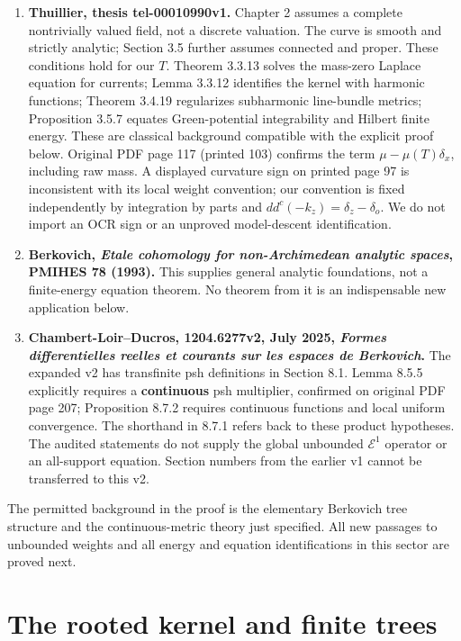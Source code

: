 \documentclass[
  11pt,
]{article}
\begin{document}
\begin{enumerate}
  projective-line tree. The two closed coordinate disks do not intersect
  only in the Gauss point.
\item
  \textbf{Thuillier, thesis tel-00010990v1.} Chapter 2 assumes a
  complete nontrivially valued field, not a discrete valuation. The
  curve is smooth and strictly analytic; Section 3.5 further assumes
  connected and proper. These conditions hold for our \(T\). Theorem
  3.3.13 solves the mass-zero Laplace equation for currents; Lemma
  3.3.12 identifies the kernel with harmonic functions; Theorem 3.4.19
  regularizes subharmonic line-bundle metrics; Proposition 3.5.7 equates
  Green-potential integrability and Hilbert finite energy. These are
  classical background compatible with the explicit proof below.
  Original PDF page 117 (printed 103) confirms the term
  \(\mu-\mu(T)\delta_x\), including raw mass. A displayed curvature sign
  on printed page 97 is inconsistent with its local weight convention;
  our convention is fixed independently by integration by parts and
  \(dd^c(-k_z)=\delta_z-\delta_o\). We do not import an OCR sign or an
  unproved model-descent identification.
\item
  \textbf{Berkovich, \emph{Etale cohomology for non-Archimedean analytic
  spaces}, PMIHES 78 (1993).} This supplies general analytic
  foundations, not a finite-energy equation theorem. No theorem from it
  is an indispensable new application below.
\item
  \textbf{Chambert-Loir--Ducros, 1204.6277v2, July 2025, \emph{Formes
  differentielles reelles et courants sur les espaces de Berkovich}.}
  The expanded v2 has transfinite psh definitions in Section 8.1. Lemma
  8.5.5 explicitly requires a \textbf{continuous} psh multiplier,
  confirmed on original PDF page 207; Proposition 8.7.2 requires
  continuous functions and local uniform convergence. The shorthand in
  8.7.1 refers back to these product hypotheses. The audited statements
  do not supply the global unbounded \(\mathcal E^1\) operator or an
  all-support equation. Section numbers from the earlier v1 cannot be
  transferred to this v2.
\end{enumerate}

The permitted background in the proof is the elementary Berkovich tree
structure and the continuous-metric theory just specified. All new
passages to unbounded weights and all energy and equation
identifications in this sector are proved next.

\section{The rooted kernel and finite
trees}\label{the-rooted-kernel-and-finite-trees}
\end{document}
